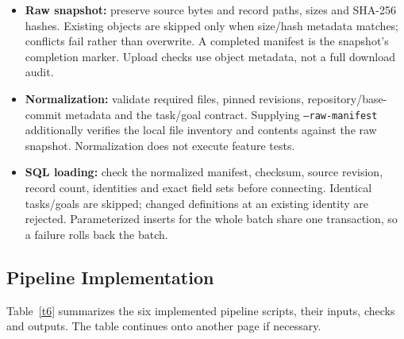 \documentclass[11pt]{article}
\newcommand{\code}[1]{\texttt{#1}}
\begin{document}
\begin{itemize}
  \item \textbf{Raw snapshot:} preserve source bytes and record paths, sizes and SHA-256 hashes. Existing objects are skipped only when size/hash metadata matches; conflicts fail rather than overwrite. A completed manifest is the snapshot's completion marker. Upload checks use object metadata, not a full download audit.
  \item \textbf{Normalization:} validate required files, pinned revisions, repository/base-commit metadata and the task/goal contract. Supplying \code{--raw-manifest} additionally verifies the local file inventory and contents against the raw snapshot. Normalization does not execute feature tests.
  \item \textbf{SQL loading:} check the normalized manifest, checksum, source revision, record count, identities and exact field sets before connecting. Identical tasks/goals are skipped; changed definitions at an existing identity are rejected. Parameterized inserts for the whole batch share one transaction, so a failure rolls back the batch.
\end{itemize}
\subsection*{Pipeline Implementation}

Table~\ref{t6} summarizes the six implemented pipeline scripts, their inputs,
checks and outputs. The table continues onto another page if necessary.
\end{document}
